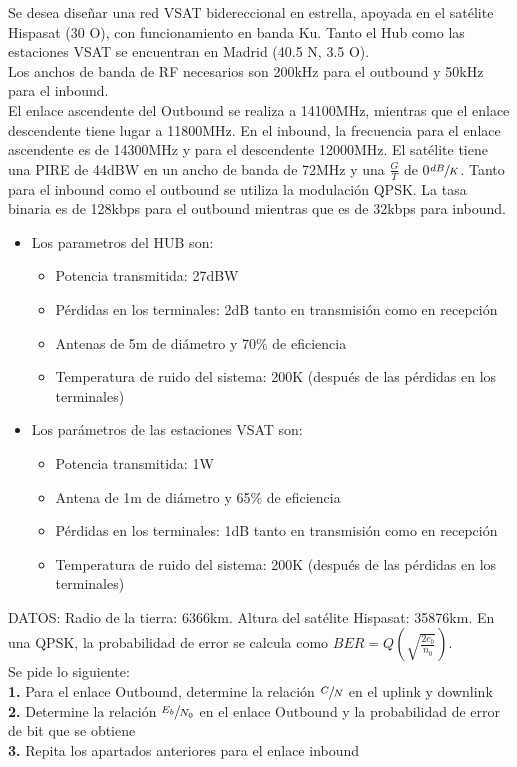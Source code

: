 \begin{exercise}[2]
	Se desea diseñar una red VSAT bidereccional en estrella, apoyada en el satélite Hispasat (30 O), con funcionamiento en banda Ku. Tanto el Hub como las estaciones VSAT se encuentran en Madrid (40.5 N, 3.5 O).\\
	Los anchos de banda de RF necesarios son 200kHz para el outbound y 50kHz para el inbound.\\
	El enlace ascendente del Outbound se realiza a 14100MHz, mientras que el enlace descendente tiene lugar a 11800MHz. En el inbound, la frecuencia para el enlace ascendente es de 14300MHz y para el descendente 12000MHz. El satélite tiene una PIRE de 44dBW en un ancho de banda de 72MHz y una $\frac{G}{T}$ de 0$\sfrac{dB}{K}$. Tanto para el inbound como el outbound se utiliza la modulación QPSK. La tasa binaria es de 128kbps para el outbound mientras que es de 32kbps para inbound.
	\begin{itemize}
		\item Los parametros del HUB son:
		\begin{itemize}
			\item Potencia transmitida: 27dBW 
			\item Pérdidas en los terminales: 2dB tanto en transmisión como en recepción
			\item Antenas de 5m de diámetro y 70\% de eficiencia
			\item Temperatura de ruido del sistema: 200K (después de las pérdidas en los terminales)
		\end{itemize}
		\item Los parámetros de las estaciones VSAT son:
		\begin{itemize}
			\item Potencia transmitida: 1W
			\item Antena de 1m de diámetro y 65\% de eficiencia
			\item Pérdidas en los terminales: 1dB tanto en transmisión como en recepción
			\item Temperatura de ruido del sistema: 200K (después de las pérdidas en los terminales)
		\end{itemize}
	\end{itemize}
	DATOS: Radio de la tierra: 6366km. Altura del satélite Hispasat: 35876km. En una QPSK, la probabilidad de error se calcula como $BER=Q(\sqrt{\frac{2e_b}{n_0}})$.\\
	Se pide lo siguiente:\\
	\textbf{1.} Para el enlace Outbound, determine la relación $\sfrac{C}{N}$ en el uplink y downlink\\ 
	\textbf{2.} Determine la relación $\sfrac{E_b}{N_0}$ en el enlace Outbound y la probabilidad de error de bit que se obtiene \\
	\textbf{3.} Repita los apartados anteriores para el enlace inbound
\end{exercise}
